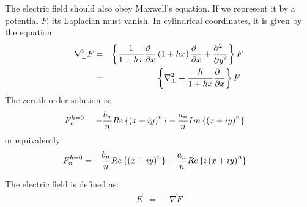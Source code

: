 \documentclass[11pt]{article} %
\begin{document}
The electric field should also obey Maxwell's equation. If we represent it by a potential $F$, its Laplacian must vanish. In cylindrical coordinates, it is given by the equation:
%
\begin{eqnarray}{\nabla }_{\perp }^{2}F &=
& \left\{{{1 \over 1+hx}{\partial \hphantom{x} \over \partial x}\left({1+hx}\right){\partial \hphantom{x} \over \partial x}+{{\partial }^{2}\hphantom{x} \over {\partial y}^{2}}}\right\}F\nonumber \\
  &=
& \left\{{{\nabla }_{\perp }^{2}+{h \over 1+hx}{\partial \hphantom{x} \over \partial x}}\right\}F\ \label{eq:elec}\end{eqnarray}
%
The zeroth order solution is:
%
\begin{eqnarray}{F}_{n}^{h=
0}&=-{{b}_{n} \over n}Re\left\{{{\left({x+iy}\right)}^{n}}\right\}-{{a}_{n} \over n}Im\left\{{{\left({x+iy}\right)}^{n}}\right\}  \label{eq:hsolev} \end{eqnarray}
%
or equivalently
%
\begin{eqnarray}{F}_{n}^{h=
0}&=-{{b}_{n} \over n}Re\left\{{{\left({x+iy}\right)}^{n}}\right\}+{{a}_{n} \over n}Re\left\{{{i\left({x+iy}\right)}^{n}}\right\}  \label{eq:hsolevi} \end{eqnarray}
%

The electric field is defined as:
%
\begin{eqnarray}\vec{E} &=
& -\vec{\nabla }F\end{eqnarray}
\end{document}
